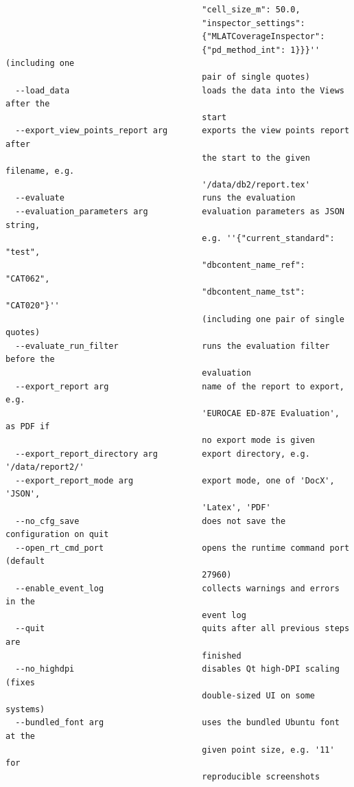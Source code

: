 \begin{lstlisting}
                                        "cell_size_m": 50.0,
                                        "inspector_settings":
                                        {"MLATCoverageInspector":
                                        {"pd_method_int": 1}}}'' (including one
                                        pair of single quotes)
  --load_data                           loads the data into the Views after the
                                        start
  --export_view_points_report arg       exports the view points report after
                                        the start to the given filename, e.g.
                                        '/data/db2/report.tex'
  --evaluate                            runs the evaluation
  --evaluation_parameters arg           evaluation parameters as JSON string,
                                        e.g. ''{"current_standard": "test",
                                        "dbcontent_name_ref": "CAT062",
                                        "dbcontent_name_tst": "CAT020"}''
                                        (including one pair of single quotes)
  --evaluate_run_filter                 runs the evaluation filter before the
                                        evaluation
  --export_report arg                   name of the report to export, e.g.
                                        'EUROCAE ED-87E Evaluation', as PDF if
                                        no export mode is given
  --export_report_directory arg         export directory, e.g. '/data/report2/'
  --export_report_mode arg              export mode, one of 'DocX', 'JSON',
                                        'Latex', 'PDF'
  --no_cfg_save                         does not save the configuration on quit
  --open_rt_cmd_port                    opens the runtime command port (default
                                        27960)
  --enable_event_log                    collects warnings and errors in the
                                        event log
  --quit                                quits after all previous steps are
                                        finished
  --no_highdpi                          disables Qt high-DPI scaling (fixes
                                        double-sized UI on some systems)
  --bundled_font arg                    uses the bundled Ubuntu font at the
                                        given point size, e.g. '11' for
                                        reproducible screenshots
\end{lstlisting}
\ \\

